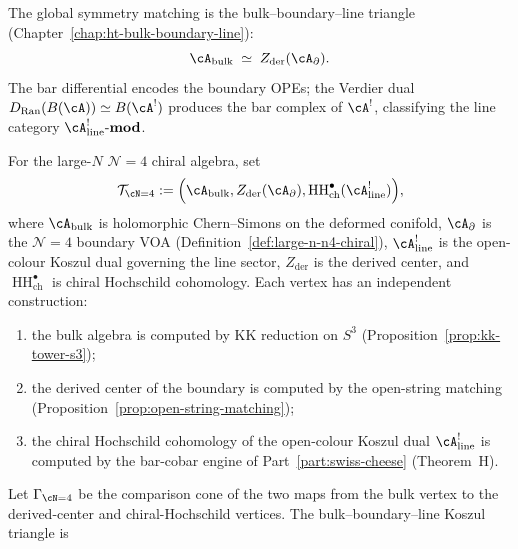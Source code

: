 \begin{remark}
\label{rem:symmetry-koszul}
The global symmetry matching is the bulk--boundary--line triangle
\textup{(}Chapter~\textup{\ref{chap:ht-bulk-boundary-line}}\textup{)}:
\begin{equation}\label{eq:symmetry-koszul-matching}
\cA_{\mathrm{bulk}} \;\simeq\; Z_{\mathrm{der}}(\cA_{\partial}).
\end{equation}
The bar differential encodes the boundary OPEs; the Verdier dual
$D_{\mathrm{Ran}}(B(\cA)) \simeq B(\cA^!)$ produces the bar complex
of $\cA^!$, classifying the line category
$\cA^!_{\mathrm{line}}\text{-}\mathbf{mod}$.
\end{remark}

\begin{proposition}[The Koszul comparison criterion for $\mathcal{N}=4$]
\label{prop:n4-koszul-comparison-criterion}
For the large-$N$ $\mathcal{N}=4$ chiral algebra, set
\begin{equation}\label{eq:n4-koszul-triangle}
\mathcal T_{\cN=4}
:=
\Bigl(
 \cA_{\mathrm{bulk}},
 Z_{\mathrm{der}}(\cA_{\partial}),
 \operatorname{HH}^\bullet_{\mathrm{ch}}(\cA^!_{\mathrm{line}})
\Bigr),
\end{equation}
where $\cA_{\mathrm{bulk}}$ is holomorphic Chern--Simons on the
deformed conifold, $\cA_\partial$ is the $\mathcal{N}=4$ boundary VOA
(Definition~\ref{def:large-n-n4-chiral}), $\cA^!_{\mathrm{line}}$ is
the open-colour Koszul dual governing the line sector,
$Z_{\mathrm{der}}$ is the derived center, and
$\operatorname{HH}^\bullet_{\mathrm{ch}}$ is chiral Hochschild
cohomology. Each vertex has an independent construction:
\begin{enumerate}[label=\textup{(\roman*)},nosep]
\item the bulk algebra is computed by KK reduction on $S^3$
 (Proposition~\ref{prop:kk-tower-s3});
\item the derived center of the boundary is computed by the open-string
 matching (Proposition~\ref{prop:open-string-matching});
\item the chiral Hochschild cohomology of the open-colour Koszul dual
 $\cA^!_{\mathrm{line}}$ is computed by the bar-cobar engine of
 Part~\ref{part:swiss-cheese} (Theorem~H).
\end{enumerate}
Let $\Gamma_{\cN=4}$ be the comparison cone of the two maps from the bulk vertex to the
derived-center and chiral-Hochschild vertices. The bulk--boundary--line Koszul triangle is

\end{proposition}
